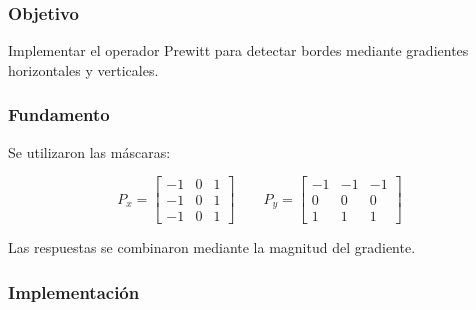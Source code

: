 \documentclass[11pt,letterpaper]{article}
\begin{document}
\subsubsection*{Objetivo}

Implementar el operador Prewitt
para detectar bordes mediante
gradientes horizontales y verticales.

\subsubsection*{Fundamento}

Se utilizaron las máscaras:

\[
P_x=
\begin{bmatrix}
-1&0&1\\
-1&0&1\\
-1&0&1
\end{bmatrix}
\qquad
P_y=
\begin{bmatrix}
-1&-1&-1\\
0&0&0\\
1&1&1
\end{bmatrix}
\]

Las respuestas se combinaron
mediante la magnitud del gradiente.

\subsubsection*{Implementación}
\end{document}
